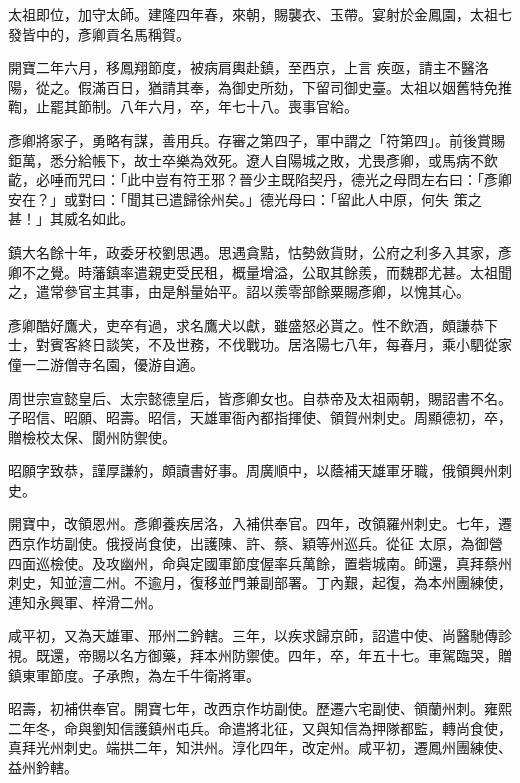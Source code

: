 \begin{pinyinscope}
 太祖即位，加守太師。建隆四年春，來朝，賜襲衣、玉帶。宴射於金鳳園，太祖七發皆中的，彥卿貢名馬稱賀。



 開寶二年六月，移鳳翔節度，被病肩輿赴鎮，至西京，上言
 疾亟，請主不醫洛陽，從之。假滿百日，猶請其奉，為御史所劾，下留司御史臺。太祖以姻舊特免推鞫，止罷其節制。八年六月，卒，年七十八。喪事官給。



 彥卿將家子，勇略有謀，善用兵。存審之第四子，軍中謂之「符第四」。前後賞賜鉅萬，悉分給帳下，故士卒樂為效死。遼人自陽城之敗，尤畏彥卿，或馬病不飲齕，必唾而咒曰：「此中豈有符王邪？晉少主既陷契丹，德光之母問左右曰：「彥卿安在？」或對曰：「聞其已遣歸徐州矣。」德光母曰：「留此人中原，何失
 策之甚！」其威名如此。



 鎮大名餘十年，政委牙校劉思遇。思遇貪黠，怙勢斂貨財，公府之利多入其家，彥卿不之覺。時藩鎮率遣親吏受民租，概量增溢，公取其餘羨，而魏郡尤甚。太祖聞之，遣常參官主其事，由是斛量始平。詔以羨零部餘粟賜彥卿，以愧其心。



 彥卿酷好鷹犬，吏卒有過，求名鷹犬以獻，雖盛怒必貰之。性不飲酒，頗謙恭下士，對賓客終日談笑，不及世務，不伐戰功。居洛陽七八年，每春月，乘小駟從家僮一二游僧寺名園，優游自適。



 周世宗宣懿皇后、太宗懿德皇后，皆彥卿女也。自恭帝及太祖兩朝，賜詔書不名。子昭信、昭願、昭壽。昭信，天雄軍衙內都指揮使、領賀州刺史。周顯德初，卒，贈檢校太保、閬州防禦使。



 昭願字致恭，謹厚謙約，頗讀書好事。周廣順中，以蔭補天雄軍牙職，俄領興州刺史。



 開寶中，改領恩州。彥卿養疾居洛，入補供奉官。四年，改領羅州刺史。七年，遷西京作坊副使。俄授尚食使，出護陳、許、蔡、穎等州巡兵。從征
 太原，為御營四面巡檢使。及攻幽州，命與定國軍節度偓率兵萬餘，置砦城南。師還，真拜蔡州刺史，知並澶二州。不逾月，復移並門兼副部署。丁內艱，起復，為本州團練使，連知永興軍、梓滑二州。



 咸平初，又為天雄軍、邢州二鈐轄。三年，以疾求歸京師，詔遣中使、尚醫馳傳診視。既還，帝賜以名方御藥，拜本州防禦使。四年，卒，年五十七。車駕臨哭，贈鎮東軍節度。子承煦，為左千牛衛將軍。



 昭壽，初補供奉官。開寶七年，改西京作坊副使。歷遷六宅副使、領蘭州刺。雍熙二年冬，命與劉知信護鎮州屯兵。命遣將北征，又與知信為押隊都監，轉尚食使，真拜光州刺史。端拱二年，知洪州。淳化四年，改定州。咸平初，遷鳳州團練使、益州鈐轄。




\end{pinyinscope}
